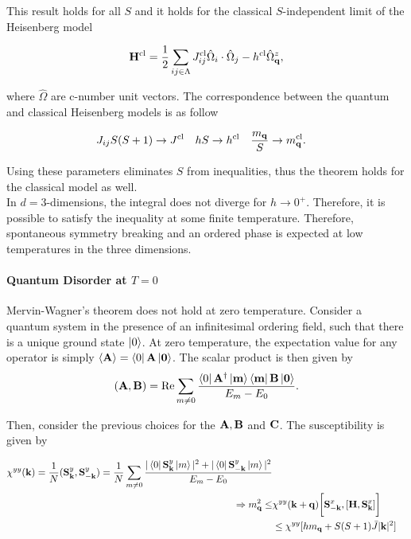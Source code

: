 \documentclass{homework}
\begin{document}
This result holds for all $S$ and it holds for the classical $S$-independent limit of the Heisenberg model 

\begin{equation}
    {\bf H}^{\textnormal{cl}} = \frac{1}{2} \sum_{ij \in \Lambda} J_{ij}^{\textnormal{cl}} \hat{\Omega}_i \cdot \hat{\Omega}_j - h^{\textnormal{cl}} \hat{\Omega}_{{\bf q}}^z,
\end{equation}

where $\hat{\Omega}$ are c-number unit vectors. The correspondence between the quantum and classical Heisenberg models is as follow 

\begin{align*}
    J_{ij} S(S+1) &\rightarrow J^{\textnormal{cl}} & hS & \rightarrow h^{\textnormal{cl}} & \frac{m_{{\bf q}}}{S} & \rightarrow m_{{\bf q}}^{\textnormal{cl}}.
\end{align*}

Using these parameters eliminates $S$ from inequalities, thus the theorem holds for the classical model as well. \\

In $d=3$-dimensions, the integral does not diverge for $h \rightarrow 0^+$. Therefore, it is possible to satisfy the inequality at some finite temperature. Therefore, spontaneous symmetry breaking and an ordered phase is expected at low temperatures in the three dimensions. \\

\paragraph{\textbf{Quantum Disorder at $T = 0$}}
\label{Quantum_disorder_zero_temp_MW}

Mervin-Wagner's theorem does not hold at zero temperature. Consider a quantum system in the presence of an infinitesimal ordering field, such that there is a unique ground state $\ket{0}$. At zero temperature, the expectation value for any operator is simply $\langle {\bf A} \rangle = \bra{0} {\bf A} \ket{0}$. The scalar product is then given by 
$$
    ({\bf A}, {\bf B}) = \Re \sum_{m \neq 0} \frac{\bra{0} {\bf A}^\dagger \ket{m} \bra{m} {\bf B} \ket{0}}{E_m - E_0}.
$$

Then, consider the previous choices for the ${\bf A}, {\bf B}$ and ${\bf C}$. The susceptibility is given by 

\begin{equation}
    \begin{split}
        \chi^{yy}({\bf k}) = \frac{1}{N} ({\bf S}_{{\bf k}}^y, {\bf S}_{-{\bf k}}^y) = \frac{1}{N} \sum_{m \neq 0} \frac{|\bra{0}{{\bf S}}^{y}_{{\bf k}} \ket{m}|^2 + |\bra{0}{{\bf S}}^{y}_{-{\bf k}}  \ket{m}|^2}{E_m - E_0} \\
        \Rightarrow m_{{\bf q}}^2 \leq& \chi^{yy}({\bf k+q}) \bigg[{\bf S}^x_{-{\bf k}}, [{\bf H}, {\bf S}^x_{{\bf k}}]\bigg] \\
        &\leq \chi^{yy}[h m_{\bf q} + S(S+1) \bar{J} |{\bf k}|^2]
    \end{split}
\end{equation}
\end{document}
